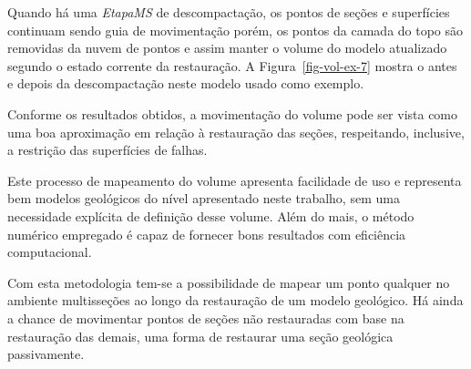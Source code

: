 Quando há uma \emph{EtapaMS} de descompactação, os pontos de seções e superfícies continuam sendo guia de movimentação porém, os pontos da camada do topo são removidas da nuvem de pontos e assim manter o volume do modelo atualizado segundo o estado corrente da restauração. A Figura~\ref{fig-vol-ex-7} mostra o antes e depois da descompactação neste modelo usado como exemplo.

Conforme os resultados obtidos, a movimentação do volume pode ser vista como uma boa aproximação em relação à restauração das seções, respeitando, inclusive, a restrição das superfícies de falhas.

Este processo de mapeamento do volume apresenta facilidade de uso e representa bem modelos geológicos do nível apresentado neste trabalho, sem uma necessidade explícita de definição desse volume. Além do mais, o método numérico empregado é capaz de fornecer bons resultados com eficiência computacional.

Com esta metodologia tem-se a possibilidade de mapear um ponto qualquer no ambiente multisseções ao longo da restauração de um modelo geológico. Há ainda a chance de movimentar pontos de seções não restauradas com base na restauração das demais, uma forma de restaurar uma seção geológica passivamente.
